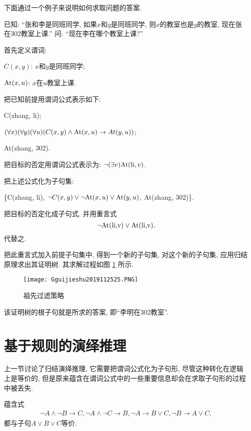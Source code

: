 下面通过一个例子来说明如何求取问题的答案.
\begin{example}
    已知: “张和李是同班同学, 如果$x$和$y$是同班同学, 则$x$的教室也是$y$的教室, 现在张在302教室上课.” 问: “现在李在哪个教室上课?”
\end{example}
\begin{result}
首先定义谓词:
\begin{center}
\begin{flushleft}
\quad $C(x, y)$:     $x$和$y$是同班同学;

\quad $\textup{At}(x, u)$:    $x$在$u$教室上课.
\end{flushleft}
\end{center}
把已知前提用谓词公式表示如下:
\begin{center}
\begin{flushleft}
\quad C(zhang, li);

\quad $(\forall x) (\forall y) (\forall u) (C(x, y)\wedge \textup{At}(x, u)\rightarrow At(y,u))$;

\quad \textup{At}(zhang, 302).
\end{flushleft}
\end{center}
把目标的否定用谓词公式表示为: $\neg (\exists  v)\textup{At}(\textup{li}, v)$.

把上述公式化为子句集:
\begin{center}
    \{\textup{C(zhang, li)}, $\neg C(x, y)\vee \neg \textup{At}(x, u)\vee \textup{At}(y, u)$, \textup{At}(zhang, 302)\}.
\end{center}

把目标的否定化成子句式, 并用重言式
 $$\neg \textup{At(li,v)} \vee \textup{At(li,v)}.$$
代替之.
\end{result}
把此重言式加入前提子句集中, 得到一个新的子句集, 对这个新的子句集, 应用归结原理求出其证明树. 其求解过程如图 \ref{AI32fig20200425} 所示.
\begin{figure}[H]
\centering
    \texttt{[image: Gguijieshu2019112525.PNG]}
    \caption{祖先过滤策略}
    \label{AI32fig20200425}
\end{figure}
该证明树的根子句就是所求的答案, 即“李明在302教室”.
\section{基于规则的演绎推理}
    上一节讨论了归结演绎推理, 它需要把谓词公式化为子句形, 尽管这种转化在逻辑上是等价的, 但是原来蕴含在谓词公式中的一些重要信息却会在求取子句形的过程中被丢失.
\begin{example}
蕴含式
\begin{align}
    \neg A\wedge \neg B\rightarrow C,  \neg A\wedge \neg C\rightarrow B,  \neg A\rightarrow B\vee C,\neg B\rightarrow A\vee C,
\end{align}
都与子句$A\vee B\vee C$等价.
\end{example}

